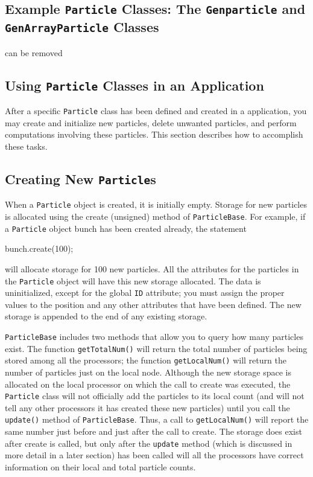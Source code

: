 \subsection{Example \texttt{Particle} Classes: {\color{red} The \texttt{Genparticle} and \texttt{GenArrayParticle}} Classes}
{\color{red} can be removed}


\subsection{Using \texttt{Particle} Classes in an Application}

After a specific \texttt{Particle} class has been defined and created in a \ippl application, you may create and initialize new particles, delete unwanted particles, and perform computations involving these particles. This section describes how to accomplish these tasks.

\subsection{Creating New \texttt{Particle}s}

When a \texttt{Particle} object is created, it is initially empty. Storage for new particles is allocated using the create (unsigned) method of \texttt{ParticleBase}. For example, if a \texttt{Particle} object bunch has been created already, the statement
\begin{smallcode}
bunch.create(100);
\end{smallcode}


will allocate storage for 100 new particles. All the attributes for the particles in the \texttt{Particle} object will have this new storage allocated. The data is uninitialized, except for the global \texttt{ID} attribute; you must assign the proper values to the position and any other attributes that have been defined. The new storage is appended to the end of any existing storage.

\texttt{ParticleBase} includes two methods that allow you to query how many particles exist. The function \texttt{getTotalNum()} will return the total number of particles being stored among all the processors; the function \texttt{getLocalNum()} will return the number of particles just on the local node. Although the new storage space is allocated on the local processor on which the call to create was executed, the \texttt{Particle} class will not officially add the particles to its
local count (and will not tell any other processors it has created these new particles) until you call the \texttt{update()} method of \texttt{ParticleBase}. Thus, a call to \texttt{getLocalNum()} will report the same number just before and just after the call to create. The storage does exist after create is called, but only after the \texttt{update} method (which is discussed in more detail in a later section) has been called will all the processors have correct information on their local and total particle counts.

